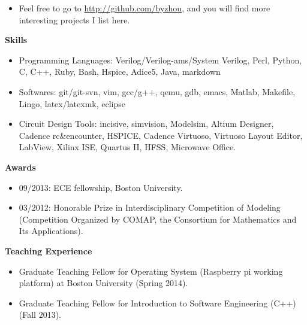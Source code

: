 \documentclass[]{article}
\begin{document}
\begin{itemize}
\begin{itemize}
        \item Feel free to go to \url{http://github.com/byzhou}, and you will find more interesting
        projects I list here.

    \end{itemize} 



\end{itemize}

\noindent \textbf{Skills}
\begin{itemize}
\item Programming Languages:  Verilog/Verilog-ams/System Verilog, Perl, Python, C, C++, Ruby, Bash,
Hspice, Adice5, Java, markdown
\item Softwares: git/git-svn, vim, gcc/g++, qemu, gdb, emacs, Matlab, Makefile, Lingo, latex/latexmk, eclipse
\item Circuit Design Tools:  incisive, simvision, Modelsim, Altium Designer, Cadence
rc$\&$encounter, HSPICE, Cadence Virtuoso, Virtuoso Layout Editor, LabView, Xilinx ISE, Quartus II,
HFSS, Microwave Office. 

\end{itemize}
\noindent \textbf{Awards}
\begin{itemize}
\item 09/2013:  ECE fellowship, Boston University.

\item 03/2012:  Honorable Prize in Interdisciplinary Competition of Modeling
(Competition Organized by COMAP, the Consortium for Mathematics and Its
Applications).



\end{itemize}

\noindent \textbf{Teaching Experience}
\begin{itemize}
\item Graduate Teaching Fellow for Operating System (Raspberry pi working platform) at Boston
University
(Spring 2014).
\item Graduate Teaching Fellow for Introduction to Software Engineering (C++) (Fall
2013).
\end{itemize}
\end{document}
